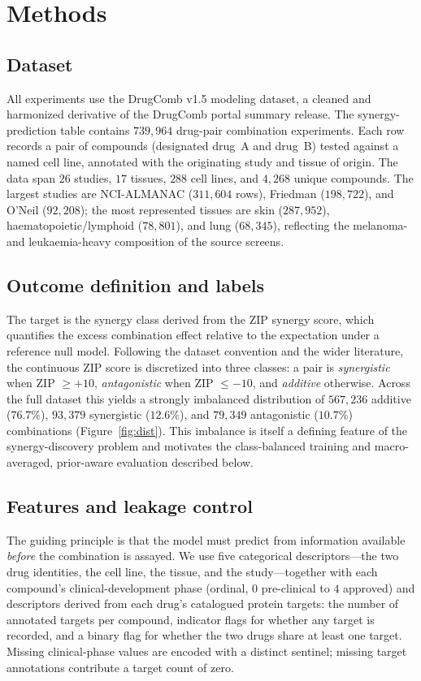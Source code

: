 \documentclass[11pt]{article}
\begin{document}
\section{Methods}

\subsection{Dataset}
All experiments use the DrugComb v1.5 modeling dataset, a cleaned and harmonized derivative of the
DrugComb portal summary release. The synergy-prediction table contains $739{,}964$ drug-pair
combination experiments. Each row records a pair of compounds (designated drug~A and drug~B) tested
against a named cell line, annotated with the originating study and tissue of origin. The data span
$26$ studies, $17$ tissues, $288$ cell lines, and $4{,}268$ unique compounds. The largest studies are
NCI-ALMANAC ($311{,}604$ rows), Friedman ($198{,}722$), and O'Neil ($92{,}208$); the most represented
tissues are skin ($287{,}952$), haematopoietic/lymphoid ($78{,}801$), and lung ($68{,}345$),
reflecting the melanoma- and leukaemia-heavy composition of the source screens.

\subsection{Outcome definition and labels}
The target is the synergy class derived from the ZIP synergy score, which quantifies the excess
combination effect relative to the expectation under a reference null model. Following the dataset
convention and the wider literature, the continuous ZIP score is discretized into three classes: a
pair is \emph{synergistic} when ZIP $\geq +10$, \emph{antagonistic} when ZIP $\leq -10$, and
\emph{additive} otherwise. Across the full dataset this yields a strongly imbalanced distribution of
$567{,}236$ additive ($76.7\%$), $93{,}379$ synergistic ($12.6\%$), and $79{,}349$ antagonistic
($10.7\%$) combinations (Figure~\ref{fig:dist}). This imbalance is itself a defining feature of the
synergy-discovery problem and motivates the class-balanced training and macro-averaged, prior-aware
evaluation described below.

\subsection{Features and leakage control}
The guiding principle is that the model must predict from information available \emph{before} the
combination is assayed. We use five categorical descriptors---the two drug identities, the cell line,
the tissue, and the study---together with each compound's clinical-development phase (ordinal,
$0$ pre-clinical to $4$ approved) and descriptors derived from each drug's catalogued protein targets:
the number of annotated targets per compound, indicator flags for whether any target is recorded, and
a binary flag for whether the two drugs share at least one target. Missing clinical-phase values are
encoded with a distinct sentinel; missing target annotations contribute a target count of zero.
\end{document}
